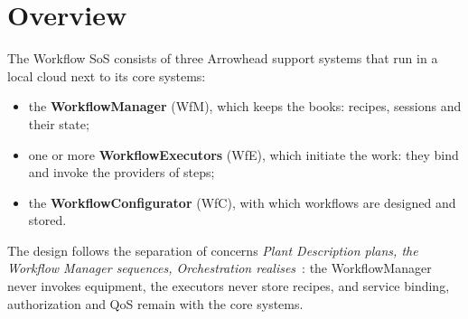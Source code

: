 \documentclass[a4paper]{arrowhead}
\begin{document}

\ArrowheadSetup

\begin{center}
  \vspace*{1cm}
  \huge{\arrowtitle}

  \vspace*{0.2cm}
  \LARGE{\arrowtype}
  \vspace*{1cm}

  
  \vspace*{\fill}

  

  \vspace*{1cm}
  \vspace*{\fill}

  \begin{abstract}
    This document describes the design of the Arrowhead Workflow System of Systems: its constituent systems, the services between them, the recipe and execution model they implement, the interaction sequences, deployment, security realisation, implementation status and verification. The black-box view is given in the SoSD. Documentation edition 5.4.0.
  \end{abstract}

  \vspace*{1cm}
\end{center}

\newpage

\tableofcontents
\newpage

\section{Overview}
\label{sec:overview}
The Workflow SoS consists of three Arrowhead support systems that run in a local cloud next to its core systems:
\begin{itemize}
\item the \textbf{WorkflowManager} (WfM), which keeps the books: recipes, sessions and their state;
\item one or more \textbf{WorkflowExecutors} (WfE), which initiate the work: they bind and invoke the providers of steps;
\item the \textbf{WorkflowConfigurator} (WfC), with which workflows are designed and stored.
\end{itemize}
The design follows the separation of concerns \emph{Plant Description plans, the Workflow Manager sequences, Orchestration
realises}~\cite{derhamy2018}: the WorkflowManager never invokes equipment, the executors never store recipes, and service
binding, authorization and QoS remain with the core systems.
\end{document}
